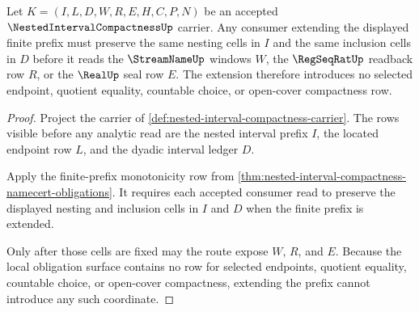 \begin{theorem}
\label{thm:nested-interval-compactness-prefix-monotonicity}
Let $K=(I,L,D,W,R,E,H,C,P,N)$ be an accepted $\NestedIntervalCompactnessUp$
carrier. Any consumer extending the displayed finite prefix must preserve the
same nesting cells in $I$ and the same inclusion cells in $D$ before it reads
the $\StreamNameUp$ windows $W$, the $\RegSeqRatUp$ readback row $R$, or the
$\RealUp$ seal row $E$. The extension therefore introduces no selected
endpoint, quotient equality, countable choice, or open-cover compactness row.
\end{theorem}
\begin{proof}
Project the carrier of \autoref{def:nested-interval-compactness-carrier}. The
rows visible before any analytic read are the nested interval prefix $I$, the
located endpoint row $L$, and the dyadic interval ledger $D$.

Apply the finite-prefix monotonicity row from
\autoref{thm:nested-interval-compactness-namecert-obligations}. It requires
each accepted consumer read to preserve the displayed nesting and inclusion
cells in $I$ and $D$ when the finite prefix is extended.

Only after those cells are fixed may the route expose $W$, $R$, and $E$.
Because the local obligation surface contains no row for selected endpoints,
quotient equality, countable choice, or open-cover compactness, extending the
prefix cannot introduce any such coordinate.
\end{proof}

